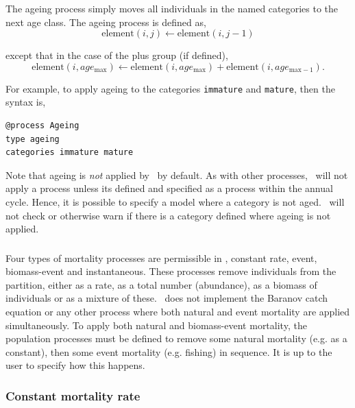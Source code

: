 \subsubsection{\label{sec:ageing}}
\CH
The ageing process simply moves all individuals in the named categories to the next age class. The ageing process is defined as,
\begin{equation}
  \text{element}(i,j) \leftarrow \text{element}(i,j-1)
\end{equation}

except that in the case of the plus group (if defined), 
\begin{equation}
  \text{element}(i,age_{\text{max}}) \leftarrow \text{element}(i,age_{\text{max}}) + \text{element}(i,age_{\text{max}-1}).
\end{equation}

For example, to apply ageing to the categories \texttt{immature} and \texttt{mature}, then the syntax is,

{\small{\begin{verbatim}
@process Ageing
type ageing
categories immature mature
\end{verbatim}}}

Note that ageing is \emph{not} applied by \CNAME\ by default. As with other processes, \CNAME\ will not apply a process unless its defined and specified as a process within the annual cycle. Hence, it is possible to specify a model where a category is not aged. \CNAME\ will not check or otherwise warn if there is a category defined where ageing is not applied.

\subsubsection{\label{sec:mortality}}
\CH
Four types of mortality processes are permissible in \CNAME, constant rate, event, biomass-event and instantaneous. These processes remove individuals from the partition, either as a rate, as a total number (abundance), as a biomass of individuals or as a mixture of these. \CNAME\ does not implement the Baranov catch equation or any other process where both natural and event mortality are applied simultaneously. To apply both natural and biomass-event mortality, the population processes must be defined to remove some natural mortality (e.g. as a constant), then some event mortality (e.g. fishing) in sequence. It is up to the user to specify how this happens.

\subsubsection*{Constant mortality rate}


